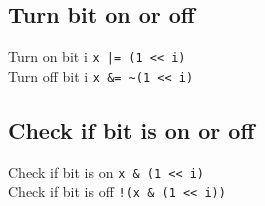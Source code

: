 \subsection{Turn bit on or off}
Turn on bit i \lstinline{x |= (1 << i)}\\
Turn off bit i \lstinline{x &= ~(1 << i)}\\
\subsection{Check if bit is on or off}
Check if bit is on \lstinline{x & (1 << i)}\\
Check if bit is off \lstinline{!(x & (1 << i))}\\